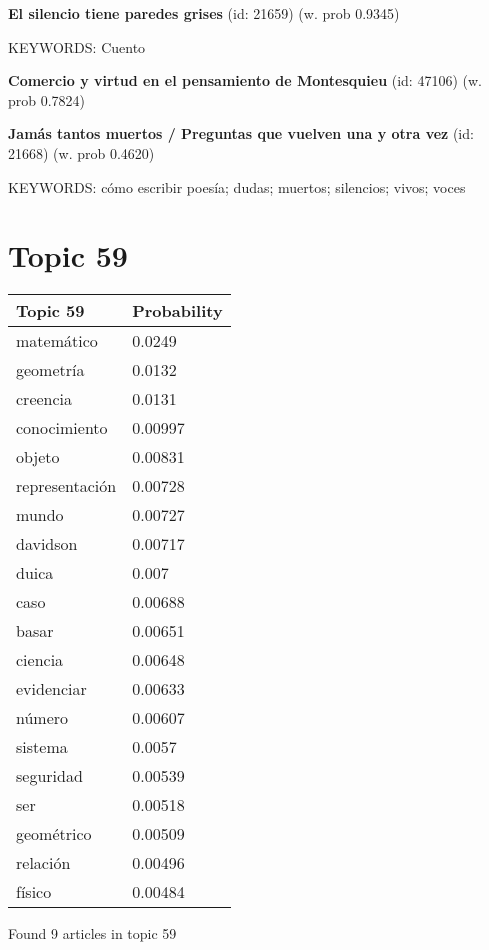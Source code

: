\documentclass{article}
\begin{document}
\textbf{El silencio tiene paredes grises} (id: 21659)
 (w. prob 0.9345)


KEYWORDS:
Cuento
\vfill

\textbf{Comercio y virtud en el pensamiento de Montesquieu} (id: 47106)
 (w. prob 0.7824)
\vfill

\textbf{Jamás tantos muertos / Preguntas que vuelven una y otra vez} (id: 21668)
 (w. prob 0.4620)


KEYWORDS:
cómo escribir poesía; dudas; muertos; silencios; vivos; voces

\vfill
\newpage


\centering
\thispagestyle{empty}
\section*{Topic 59}\vfill
\begin{tabular}{ll}
\toprule
       Topic 59 & Probability \\
\midrule
     matemático &      0.0249 \\
      geometría &      0.0132 \\
       creencia &      0.0131 \\
   conocimiento &     0.00997 \\
         objeto &     0.00831 \\
 representación &     0.00728 \\
          mundo &     0.00727 \\
       davidson &     0.00717 \\
          duica &       0.007 \\
           caso &     0.00688 \\
          basar &     0.00651 \\
        ciencia &     0.00648 \\
     evidenciar &     0.00633 \\
         número &     0.00607 \\
        sistema &      0.0057 \\
      seguridad &     0.00539 \\
            ser &     0.00518 \\
     geométrico &     0.00509 \\
       relación &     0.00496 \\
         físico &     0.00484 \\
\bottomrule
\end{tabular}

\vfill
Found 9 articles in topic 59
\vfill
\end{document}
